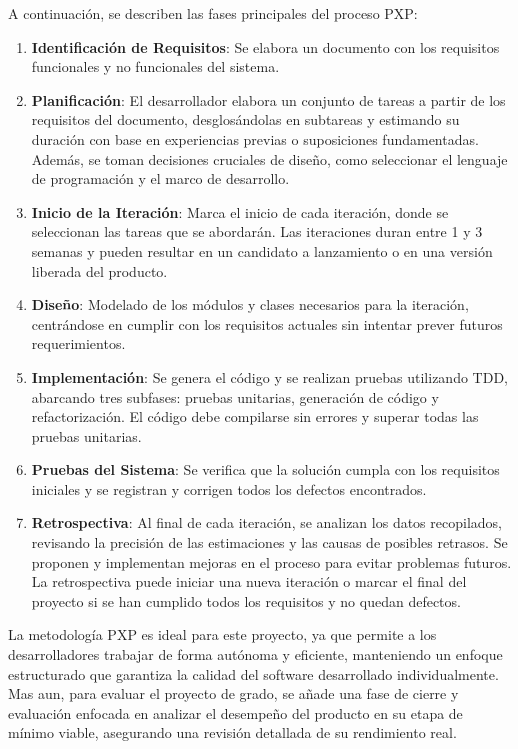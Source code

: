 \noindent
A continuación, se describen las fases principales del proceso PXP:
\begin{enumerate}[topsep=0pt, itemsep=0mm]
    \item \textbf{Identificación de Requisitos}: Se elabora un documento con los requisitos funcionales y no funcionales del sistema. 
    \item \textbf{Planificación}: El desarrollador elabora un conjunto de tareas a partir de los requisitos del documento, desglosándolas en subtareas y estimando su duración con base en experiencias previas o suposiciones fundamentadas. Además, se toman decisiones cruciales de diseño, como seleccionar el lenguaje de programación y el marco de desarrollo.
    \item \textbf{Inicio de la Iteración}: Marca el inicio de cada iteración, donde se seleccionan las tareas que se abordarán. Las iteraciones duran entre 1 y 3 semanas y pueden resultar en un candidato a lanzamiento o en una versión liberada del producto.
    \item \textbf{Diseño}: Modelado de los módulos y clases necesarios para la iteración, centrándose en cumplir con los requisitos actuales sin intentar prever futuros requerimientos. 
    \item \textbf{Implementación}: Se genera el código y se realizan pruebas utilizando TDD, abarcando tres subfases: pruebas unitarias, generación de código y refactorización. El código debe compilarse sin errores y superar todas las pruebas unitarias.
    \item \textbf{Pruebas del Sistema}: Se verifica que la solución cumpla con los requisitos iniciales y se registran y corrigen todos los defectos encontrados.
    \item \textbf{Retrospectiva}: Al final de cada iteración, se analizan los datos recopilados, revisando la precisión de las estimaciones y las causas de posibles retrasos. Se proponen y implementan mejoras en el proceso para evitar problemas futuros. La retrospectiva puede iniciar una nueva iteración o marcar el final del proyecto si se han cumplido todos los requisitos y no quedan defectos.
\end{enumerate}

La metodología PXP es ideal para este proyecto, ya que permite a los desarrolladores trabajar de forma autónoma y eficiente, manteniendo un enfoque estructurado que garantiza la calidad del software desarrollado individualmente. Mas aun, para evaluar el proyecto de grado, se añade una fase de cierre y evaluación enfocada en analizar el desempeño del producto en su etapa de mínimo viable, asegurando una revisión detallada de su rendimiento real.


